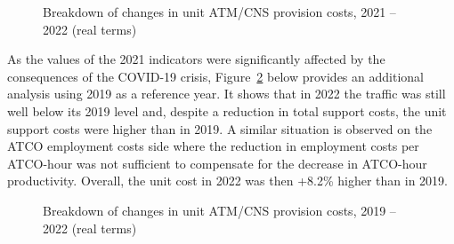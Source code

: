 \documentclass[
  letterpaper,
  DIV=11,
  numbers=noendperiod]{scrreprt}
\begin{document}
\begin{figure}


\caption{\label{fig-figure-4-3}Breakdown of changes in unit ATM/CNS
provision costs, 2021 -- 2022 (real terms)}

\end{figure}%

As the values of the 2021 indicators were significantly affected by the
consequences of the COVID-19 crisis, Figure~\ref{fig-figure-4-3-2} below
provides an additional analysis using 2019 as a reference year. It shows
that in 2022 the traffic was still well below its 2019 level and,
despite a reduction in total support costs, the unit support costs were
higher than in 2019. A similar situation is observed on the ATCO
employment costs side where the reduction in employment costs per
ATCO-hour was not sufficient to compensate for the decrease in ATCO-hour
productivity. Overall, the unit cost in 2022 was then +8.2\% higher than
in 2019.

\begin{figure}


\caption{\label{fig-figure-4-3-2}Breakdown of changes in unit ATM/CNS
provision costs, 2019 -- 2022 (real terms)}

\end{figure}%
\end{document}
